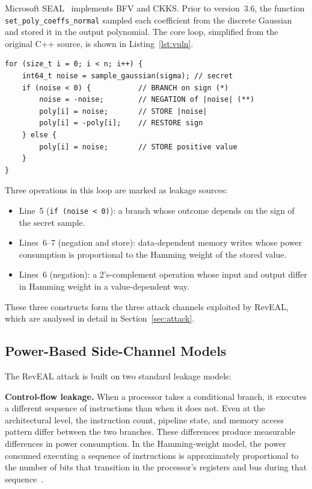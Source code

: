 \documentclass[sigconf,nonacm]{acmart}
\begin{document}
Microsoft SEAL~\cite{sealcrypto} implements BFV and CKKS. Prior to version~3.6,
the function \texttt{set\_poly\_coeffs\_normal} sampled each coefficient from the
discrete Gaussian and stored it in the output polynomial. The core loop, simplified
from the original C++ source, is shown in Listing~\ref{lst:vuln}.

\begin{lstlisting}[label=lst:vuln, caption={Vulnerable Gaussian sampling loop in SEAL pre-v3.6 (simplified from Aydin et al.).}]
for (size_t i = 0; i < n; i++) {
    int64_t noise = sample_gaussian(sigma); // secret
    if (noise < 0) {           // BRANCH on sign (*)
        noise = -noise;        // NEGATION of |noise| (**)
        poly[i] = noise;       // STORE |noise|
        poly[i] = -poly[i];    // RESTORE sign
    } else {
        poly[i] = noise;       // STORE positive value
    }
}
\end{lstlisting}

Three operations in this loop are marked as leakage sources:
\begin{itemize}
  \item Line~5 (\texttt{if (noise < 0)}): a branch whose outcome depends on the
        sign of the secret sample.
  \item Lines~6--7 (negation and store): data-dependent memory writes whose power
        consumption is proportional to the Hamming weight of the stored value.
  \item Lines~6 (negation): a 2's-complement operation whose input and output differ
        in Hamming weight in a value-dependent way.
\end{itemize}

These three constructs form the three attack channels exploited by RevEAL, which are
analysed in detail in Section~\ref{sec:attack}.

\subsection{Power-Based Side-Channel Models}

The RevEAL attack is built on two standard leakage models:

\textbf{Control-flow leakage.} When a processor takes a conditional branch, it
executes a different sequence of instructions than when it does not. Even at the
architectural level, the instruction count, pipeline state, and memory access
pattern differ between the two branches. These differences produce measurable
differences in power consumption. In the Hamming-weight model, the power consumed
executing a sequence of instructions is approximately proportional to the number of
bits that transition in the processor's registers and bus during that
sequence~\cite{mangard2007}.
\end{document}
